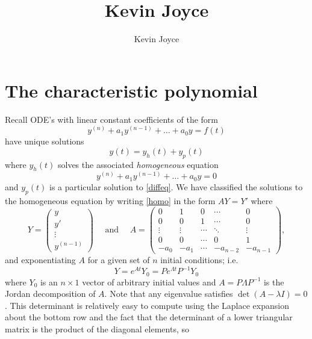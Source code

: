 \documentclass{amsart} %
\title{Kevin Joyce}
\author{Kevin Joyce}
\begin{document}
 
\newcommand{\eps}{\varepsilon}
\newcommand{\del}{\partial}
\newcommand{\CC}{\ensuremath{\mathcal C}} %
\newcommand{\RR}{\ensuremath{\mathcal R}} %

\section{The characteristic polynomial} 

Recall ODE's with linear constant coefficients of the form
\begin{equation}
  y^{(n)} + a_1 y^{(n-1)} + \dots + a_0y = f(t) \label{diffeq}
\end{equation}
have unique solutions  
\begin{equation}
  y(t) = y_h(t) + y_p(t)
\end{equation}
where $y_h(t)$ solves the associated \emph{homogeneous} equation
\begin{equation}
  y^{(n)} + a_1 y^{(n-1)} + \dots + a_0y = 0 \label{homo}
\end{equation}
and $y_p(t)$ is a particular solution to \eqref{diffeq}.  We have classified the solutions to the homogeneous equation by writing \eqref{homo} in the form $AY = Y'$ where 
$$
  Y = \begin{pmatrix}
    y\\
    y'\\
    \vdots \\
    y^{(n-1)}
  \end{pmatrix}
  \quad\text{ and }\quad
  A = \begin{pmatrix}
    0 & 1 & 0 & \cdots & 0 \\
    0 & 0 & 1 & \cdots & 0 \\
    \vdots & \vdots & \cdots & \ddots & \vdots \\
    0 & 0 & \cdots & 0 & 1\\
    -a_0 & -a_1 & \cdots & -a_{n-2} & -a_{n-1}
  \end{pmatrix},
$$
and exponentiating $A$ for a given set of $n$ initial conditions; i.e. 
\begin{equation}
  Y = e^{At} Y_0 = P e^{\Lambda t} P^{-1} Y_0 \label{solution}
\end{equation} 
where $Y_0$ is an $n\times 1$ vector of arbitrary initial values and $A = P\Lambda P^{-1}$ is the Jordan decomposition of $A$.  Note that any eigenvalue satisfies $\det (A - \lambda I) = 0$. This determinant is relatively easy to compute using the Laplace expansion about the bottom row and the fact that the determinant of a lower triangular matrix is the product of the diagonal elements, so
\end{document}
